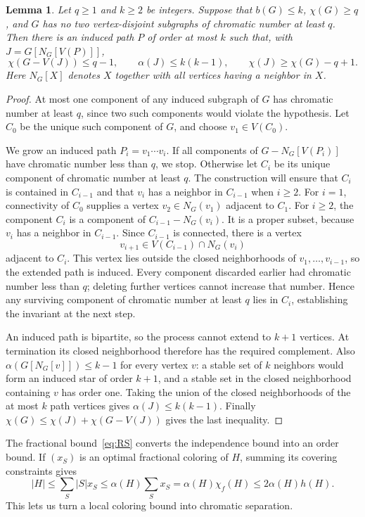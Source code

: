 \documentclass[11pt]{article}
\newtheorem{lemma}[theorem]{Lemma}
\begin{document}
\begin{lemma}\label{lem:path}
Let $q\ge1$ and $k\ge2$ be integers. Suppose that $b(G)\le k$,
$\chi(G)\ge q$, and $G$ has no two vertex-disjoint subgraphs of chromatic
number at least $q$. Then there is an induced path $P$ of order at most
$k$ such that, with $J=G[N_G[V(P)]]$,
\[
 \chi(G-V(J))\le q-1,\qquad
 \alpha(J)\le k(k-1),\qquad
 \chi(J)\ge\chi(G)-q+1.
\]
Here $N_G[X]$ denotes $X$ together with all vertices having a neighbor in $X$.
\end{lemma}
\begin{proof}
At most one component of any induced subgraph of $G$ has chromatic
number at least $q$, since two such components would violate the
hypothesis. Let $C_0$ be the unique such component of $G$, and choose
$v_1\in V(C_0)$.

We grow an induced path $P_i=v_1\cdots v_i$. If all components of
$G-N_G[V(P_i)]$ have chromatic number less than $q$, we stop.
Otherwise let $C_i$ be its unique component of chromatic number at
least $q$. The construction will ensure that $C_i$ is contained in
$C_{i-1}$ and that $v_i$ has a neighbor in $C_{i-1}$ when $i\ge2$.
For $i=1$, connectivity of $C_0$ supplies a vertex
$v_2\in N_G(v_1)$ adjacent to $C_1$.
For $i\ge2$, the component $C_i$ is a component of
$C_{i-1}-N_G(v_i)$. It is a proper subset, because $v_i$ has a neighbor
in $C_{i-1}$. Since $C_{i-1}$ is connected, there is a vertex
\[
 v_{i+1}\in V(C_{i-1})\cap N_G(v_i)
\]
adjacent to $C_i$. This vertex lies outside the closed neighborhoods
of $v_1,\ldots,v_{i-1}$, so the extended path is induced.
Every component discarded earlier had chromatic number less than
$q$; deleting further vertices cannot increase that number.
Hence any surviving component of chromatic number at least $q$
lies in $C_i$, establishing the invariant at the next step.

An induced path is bipartite, so the process cannot extend to $k+1$
vertices. At termination its closed neighborhood therefore has the
required complement. Also $\alpha(G[N_G[v]])\le k-1$ for every vertex
$v$: a stable set of $k$ neighbors would form an induced star of order
$k+1$, and a stable set in the closed neighborhood containing $v$
has order one. Taking the union of the closed neighborhoods of the
at most $k$ path vertices gives $\alpha(J)\le k(k-1)$.
Finally $\chi(G)\le\chi(J)+\chi(G-V(J))$ gives the last inequality.
\end{proof}

The fractional bound~\eqref{eq:RS} converts the independence bound
into an order bound. If $(x_S)$ is an optimal fractional coloring of
$H$, summing its covering constraints gives
\begin{equation}\label{eq:order}
 |H|\le\sum_S|S|x_S
 \le\alpha(H)\sum_Sx_S
 =\alpha(H)\chi_f(H)
 \le2\alpha(H)h(H).
\end{equation}
This lets us turn a local coloring bound into chromatic separation.
\end{document}

